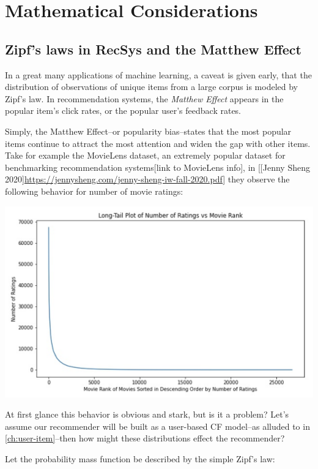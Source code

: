 \chapter{Mathematical Considerations}
\label{ch:math}

\section{Zipf's laws in RecSys and the Matthew Effect}

In a great many applications of machine learning, a caveat is given early, that the distribution of observations of unique items from a large corpus is modeled by Zipf's law. In recommendation systems, the \emph{Matthew Effect} appears in the popular item's click rates, or the popular user's feedback rates. 

Simply, the Matthew Effect–or popularity bias–states that the most popular items continue to attract the most attention and widen the gap with other items. Take for example the MovieLens dataset, an extremely popular dataset for benchmarking recommendation systems[link to MovieLens info], in [[Jenny Sheng 2020]\url{https://jennysheng.com/jenny-sheng-iw-fall-2020.pdf}] they observe the following behavior for number of movie ratings:

\vspace{10pt}
\includegraphics[width=\textwidth-10pt]{book-text/zipfian-moverank.png}

At first glance this behavior is obvious and stark, but is it a problem? Let's assume our recommender will be built as a user-based CF model–as alluded to in \ref{ch:user-item}–then how might these distributions effect the recommender?

Let the probability mass function be described by the simple Zipf's law:

